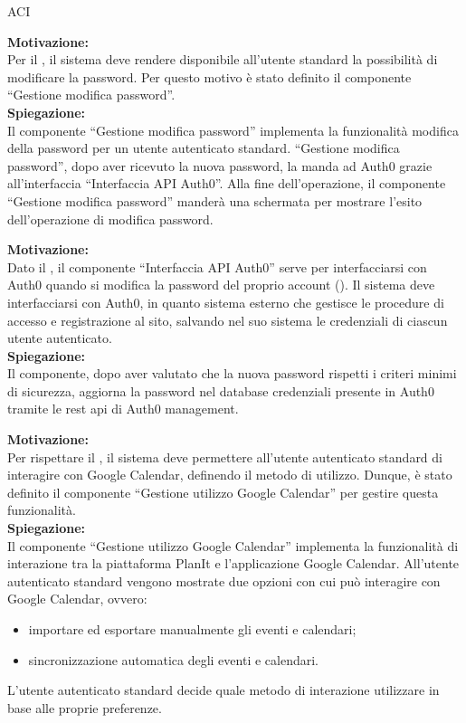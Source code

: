 \begin{listaPersonale}{ACI}

    \textbf{Motivazione:}\\
    Per il , il sistema deve rendere disponibile all'utente standard la possibilità di modificare la password. Per questo motivo è stato definito il componente “Gestione modifica password”.\\
    \textbf{Spiegazione:}\\
    Il componente “Gestione modifica password” implementa la funzionalità modifica della password per un utente autenticato standard. “Gestione modifica password”, dopo aver ricevuto la nuova password, la manda ad Auth0 grazie all'interfaccia “Interfaccia API Auth0”. Alla fine dell'operazione, il componente “Gestione modifica password” manderà una schermata per mostrare l'esito dell'operazione di modifica password.



    \textbf{Motivazione:}\\
    Dato il , il componente “Interfaccia API Auth0” serve per interfacciarsi con Auth0 quando si modifica la password del proprio account (). Il sistema deve interfacciarsi con Auth0, in quanto sistema esterno che gestisce le procedure di accesso e registrazione al sito, salvando nel suo sistema le credenziali di ciascun utente autenticato.\\
    \textbf{Spiegazione:}\\
    Il componente, dopo aver valutato che la nuova password rispetti i criteri minimi di sicurezza, aggiorna la password nel database credenziali presente in Auth0 tramite le rest api di Auth0 management.



    \textbf{Motivazione:}\\
    Per rispettare il , il sistema deve permettere all'utente autenticato standard di interagire con Google Calendar, definendo il metodo di utilizzo. Dunque, è stato definito il componente “Gestione utilizzo Google Calendar” per gestire questa funzionalità.\\
    \textbf{Spiegazione:}\\
    Il componente “Gestione utilizzo Google Calendar” implementa la funzionalità di interazione tra la piattaforma PlanIt e l'applicazione Google Calendar. All'utente autenticato standard vengono mostrate due opzioni con cui può interagire con Google Calendar, ovvero:
    \begin{itemize}
        \item importare ed esportare manualmente gli eventi e calendari;
        \item sincronizzazione automatica degli eventi e calendari.
    \end{itemize}
    L'utente autenticato standard decide quale metodo di interazione utilizzare in base alle proprie preferenze.



\end{listaPersonale}
